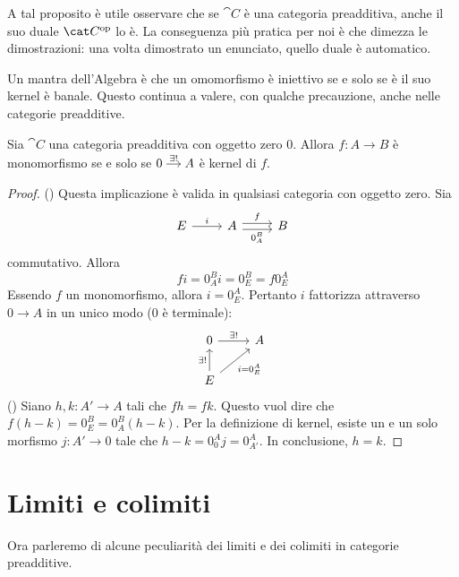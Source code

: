 \begin{remark}
  A tal proposito è utile osservare che se \(\cat C\) è una categoria
  preadditiva, anche il suo duale \(\opcat C\) lo è. La conseguenza più
  pratica per noi è che dimezza le dimostrazioni: una volta dimostrato
  un enunciato, quello duale è automatico.
\end{remark}

Un mantra dell'Algebra è che un omomorfismo è iniettivo se e solo se è
il suo kernel è banale. Questo continua a valere, con qualche
precauzione, anche nelle categorie preadditive.

\begin{proposition}\label{proposition:MonoIffKerIsTrivial}
  Sia \(\cat C\) una categoria preadditiva con oggetto zero
  \(0\). Allora \(f : A \to B\) è monomorfismo se e solo se
  \(\begin{tikzcd}[column sep=small, cramped] 0 \ar["{\exists!}", r] &
    A \end{tikzcd}\) è kernel di \(f\).
\end{proposition}

\begin{proof}
  (\Rightarrow) Questa implicazione è valida in qualsiasi categoria con
  oggetto zero. Sia
  \[
    \begin{tikzcd}
      E \ar["{i}", r] & A \ar["{f}", r, shift left] \ar["{0_A^B}", r,
      shift right, swap] & B
    \end{tikzcd}
  \]
  commutativo. Allora
  \[
    f i = 0_A^B i = 0_E^B = f 0_E^A
  \]
  Essendo \(f\) un monomorfismo, allora \(i = 0_E^A\). Pertanto \(i\)
  fattorizza attraverso \(0 \to A\) in un unico modo (\(0\) è terminale):
  \[
    \begin{tikzcd}
      0 \ar["{\exists!}", r] & A \\
      E \ar["{\exists!}", u] \ar["{i = 0_E^A}", ur, swap]
    \end{tikzcd}
  \]
  (\Leftarrow) Siano \(h, k : A' \to A\) tali che \(f h = f k\). Questo
  vuol dire che \(f (h-k) = 0_E^B = 0_A^B (h-k)\). Per la definizione di
  kernel, esiste un e un solo morfismo \(j : A' \to 0\) tale che
  \(h-k = 0_0^A j = 0_{A'}^A\). In conclusione, \(h = k\).
\end{proof}


\section{Limiti e colimiti}

Ora parleremo di alcune peculiarità dei limiti e dei colimiti in
categorie preadditive.


